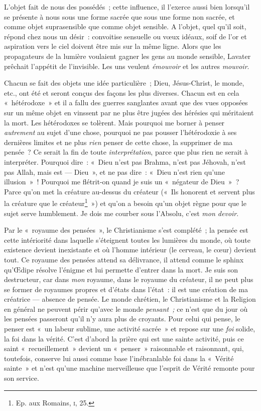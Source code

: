 \documentclass[french,twoside]{book} %
\begin{document}
L’objet fait de nous des possédés ; cette influence, il l’exerce aussi bien lorsqu’il se présente à nous sous une forme sacrée que sous une forme non sacrée, et comme objet suprasensible que comme objet sensible. A l’objet, quel qu’il soit, répond chez nous un désir : convoitise sensuelle ou vœux idéaux, soif de l’or et aspiration vers le ciel doivent être mis sur la même ligne. Alors que les propagateurs de la lumière voulaient gagner les gens au monde sensible, Lavater prêchait l’appétit de l’invisible. Les uns veulent \emph{émouvoir }et les autres \emph{mouvoir}.\par
Chacun se fait des objets une idée particulière ; Dieu, Jésus-Christ, le monde, etc., ont été et seront conçus des façons les plus diverses. Chacun est en cela « hétérodoxe » et il a fallu des guerres sanglantes avant que des vues opposées sur un même objet en vinssent par ne plus être jugées des hérésies qui méritaient la mort. Les hétérodoxes se tolèrent. Mais  pourquoi me borner à penser \emph{autrement} au sujet d’une chose, pourquoi ne pas pousser l’hétérodoxie à ses dernières limites et ne plus \emph{rien} penser de cette chose, la supprimer de ma pensée ? Ce serait la fin de toute \emph{interprétation}, parce que plus rien ne serait à interpréter. Pourquoi dire : « Dieu n’est pas Brahma, n’est pas Jéhovah, n’est pas Allah, mais est — Dieu », et ne pas dire : « Dieu n’est rien qu’une illusion » ! Pourquoi me flétrit-on quand je suis un « négateur de Dieu » ? Parce qu’on met la créature au-dessus du créateur (« Ils honorent et servent plus la créature que le créateur\footnote{ \noindent Ep. aux Romains, {\scshape i}, 25.
 } ») et qu’on a besoin qu’un objet règne pour que le sujet serve humblement. Je dois me courber sous l’Absolu, c’est \emph{mon devoir}.\par
Par le « royaume des pensées », le Christianisme s’est complété ; la pensée est cette intériorité dans laquelle s’éteignent toutes les lumières du monde, où toute existence devient inexistante et où l’homme intérieur (le cerveau, le cœur) devient tout. Ce royaume des pensées attend sa délivrance, il attend comme le sphinx qu’Œdipe résolve l’énigme et lui permette d’entrer dans la mort. Je suis son destructeur, car dans \emph{mon} royaume, dans le royaume du créateur, il ne peut plus se former de royaumes propres et d’états dans l’état : il est une création de ma créatrice — absence de pensée. Le monde chrétien, le Christianisme et la Religion en général ne peuvent périr qu’avec le monde \emph{pensant ;} ce n’est que du jour où les pensées passeront qu’il n’y aura plus de croyants. Pour celui qui pense, le penser est « un labeur sublime, une activité sacrée » et repose sur une \emph{foi} solide, la foi dans la vérité. C’est d’abord la prière qui est une sainte activité, puis ce saint « recueillement » devient un « penser » raisonnable et raisonnant, qui, toutefois, conserve lui aussi comme base l’inébranlable foi dans la « Vérité sainte » et n’est  qu’une machine merveilleuse que l’esprit de Vérité remonte pour son service.\par
\end{document}
